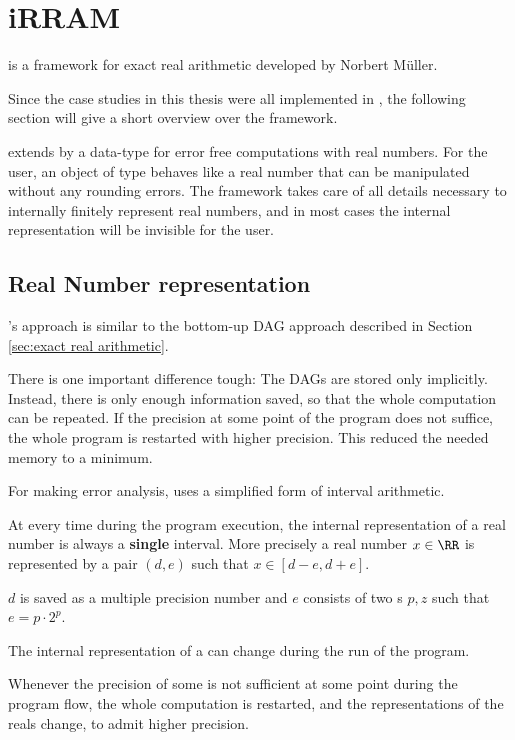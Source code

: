 \section{iRRAM}
	\irram is a \cc framework for exact real arithmetic developed by Norbert M\"uller.

	Since the case studies in this thesis were all implemented  in \irram, the
  following section will give a short overview over the \irram framework.

	\irram extends \cc by a data-type \real for error free computations with real numbers.
  For the user, an object of type \real behaves like a real number that can be
  manipulated without any rounding errors.
  The framework takes care of all details necessary to internally  finitely represent real
  numbers, and in most cases the internal representation will be invisible for
  the user.
	\subsection{Real Number representation}
		\irram's approach is similar to the bottom-up DAG approach described in
    Section \ref{sec:exact real arithmetic}.

		There is one important difference tough: The DAGs are  stored only
    implicitly.
		Instead, there is only enough information saved, so that the whole
    computation can be repeated.
    If the precision at some point of the program does not suffice, the whole
    program is restarted with higher precision. 
    This reduced the needed memory to a minimum.

    For making error analysis, \irram uses a simplified form of interval
    arithmetic.

		At every time during the program execution, the internal representation of
    a real number is always a \textbf{single} interval. 
    More precisely a real number $x \in \RR$ is represented by a pair $(d,e)$ such that $x \in [d-e, d+e]$.

 		$d$ is saved as a multiple precision number and $e$ consists of two s $p,z$ such that $e = p \cdot 2^p$.

    The internal representation of a \real can change during the run of the
    program.
 		
 	  Whenever the precision of some \real is not sufficient at some point during
    the program flow, the whole computation is restarted, and the
    representations of the reals change, to admit higher precision.

